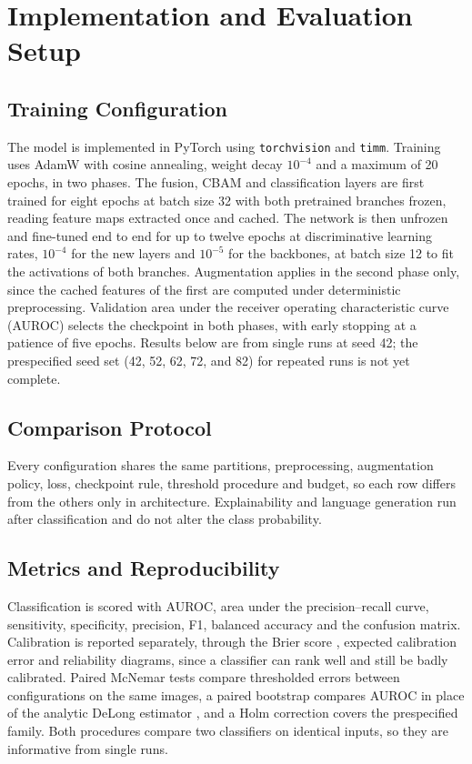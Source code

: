 \documentclass[conference]{IEEEtran}
\begin{document}
\section{Implementation and Evaluation Setup}
\label{sec:setup}
\subsection{Training Configuration}
The model is implemented in PyTorch using \texttt{torchvision} and \texttt{timm}. Training uses AdamW \cite{loshchilov2019adamw} with cosine annealing, weight decay $10^{-4}$ and a maximum of 20 epochs, in two phases. The fusion, CBAM and classification layers are first trained for eight epochs at batch size 32 with both pretrained branches frozen, reading feature maps extracted once and cached. The network is then unfrozen and fine-tuned end to end for up to twelve epochs at discriminative learning rates, $10^{-4}$ for the new layers and $10^{-5}$ for the backbones, at batch size 12 to fit the activations of both branches. Augmentation applies in the second phase only, since the cached features of the first are computed under deterministic preprocessing. Validation area under the receiver operating characteristic curve (AUROC) selects the checkpoint in both phases, with early stopping at a patience of five epochs. Results below are from single runs at seed 42; the prespecified seed set (42, 52, 62, 72, and 82) for repeated runs is not yet complete.



\subsection{Comparison Protocol}
Every configuration shares the same partitions, preprocessing, augmentation policy, loss, checkpoint rule, threshold procedure and budget, so each row differs from the others only in architecture. Explainability and language generation run after classification and do not alter the class probability.

\subsection{Metrics and Reproducibility}
Classification is scored with AUROC, area under the precision--recall curve,
sensitivity, specificity, precision, F1, balanced accuracy and the confusion
matrix. Calibration is reported separately, through the Brier score
\cite{brier1950verification}, expected calibration error
\cite{guo2017calibration} and reliability diagrams, since a classifier can
rank well and still be badly calibrated. Paired McNemar tests
\cite{mcnemar1947note} compare thresholded errors between configurations on
the same images, a paired bootstrap compares AUROC in place of the analytic DeLong estimator \cite{delong1988comparing}, and a Holm correction
\cite{holm1979simple} covers the prespecified family. Both procedures
compare two classifiers on identical inputs, so they are informative from
single runs.
\end{document}
